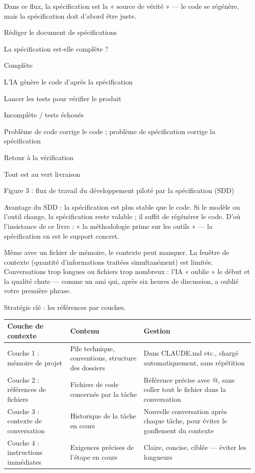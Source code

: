 Dans ce flux, la spécification est la « source de vérité » — le code se régénère, mais la spécification doit d'abord être juste.

Rédiger le document de spécifications

La spécification est-elle complète ?

Complète

L'IA génère le code d'après la spécification

Lancer les tests pour vérifier le produit

Incomplète / tests échoués

Problème de code corrige le code ; problème de spécification corrige la spécification

Retour à la vérification

Tout est au vert livraison

\begin{center}\small\color{gray}Figure 3 : flux de travail du développement piloté par la spécification (SDD)\end{center}

Avantage du SDD : la spécification est plus stable que le code. Si le modèle ou l'outil change, la spécification reste valable ; il suffit de régénérer le code. D'où l'insistance de ce livre : « la méthodologie prime sur les outils » — la spécification en est le support concret.


Même avec un fichier de mémoire, le contexte peut manquer. La fenêtre de contexte (quantité d'informations traitées simultanément) est limitée. Conversations trop longues ou fichiers trop nombreux : l'IA « oublie » le début et la qualité chute — comme un ami qui, après six heures de discussion, a oublié votre première phrase.

Stratégie clé : les références par couches.

\begin{center}
\begin{tabularx}{\linewidth}{|X|X|X|}
\hline
\textbf{Couche de contexte} & \textbf{Contenu} & \textbf{Gestion} \tabularnewline
\hline
Couche 1 : mémoire de projet & Pile technique, conventions, structure des dossiers & Dans CLAUDE.md etc., chargé automatiquement, sans répétition \tabularnewline
Couche 2 : références de fichiers & Fichiers de code concernés par la tâche & Référence précise avec @, sans coller tout le fichier dans la conversation \tabularnewline
Couche 3 : contexte de conversation & Historique de la tâche en cours & Nouvelle conversation après chaque tâche, pour éviter le gonflement du contexte \tabularnewline
Couche 4 : instructions immédiates & Exigences précises de l'étape en cours & Claire, concise, ciblée — éviter les longueurs \tabularnewline
\hline
\end{tabularx}
\end{center}

